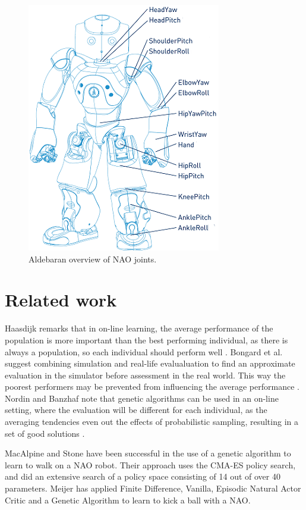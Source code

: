 \documentclass{article}
\begin{document}
\begin{figure}
	\center
	\includegraphics[scale=.85]{images/naospecsJoints}
	\caption{Aldebaran overview of NAO joints.}
	\label{fig:joints}
\end{figure}

\section{Related work}
Haasdijk remarks that in on-line learning, the average
performance of the population is more important than the best performing
individual, as there is always a population, so each individual should perform
well \cite{haasdijk2012never}. Bongard et al. suggest combining simulation
and real-life evalualuation to find an approximate evaluation in the simulator
before assessment in the real world. This way the poorest performers may be
prevented from influencing the average performance \cite{bongard2006resilient}.
Nordin and Banzhaf note that genetic algorithms can be used in an on-line
setting, where the evaluation will be different for each individual, as the
averaging tendencies even out the effects of probabilistic sampling, resulting
in a set of good solutions \cite{nordin1997line}.

MacAlpine and Stone have been successful in the use of a genetic algorithm
to learn to walk on a NAO robot. Their approach uses the CMA-ES policy search,
and did an extensive search of a policy space consisting of 14 out of over 40
parameters\cite{macalpineusing}.
Meijer has applied Finite Difference, Vanilla, Episodic
Natural Actor Critic and a Genetic Algorithm to learn to kick a ball with a
NAO\cite{meijer2012getting}.
\end{document}

